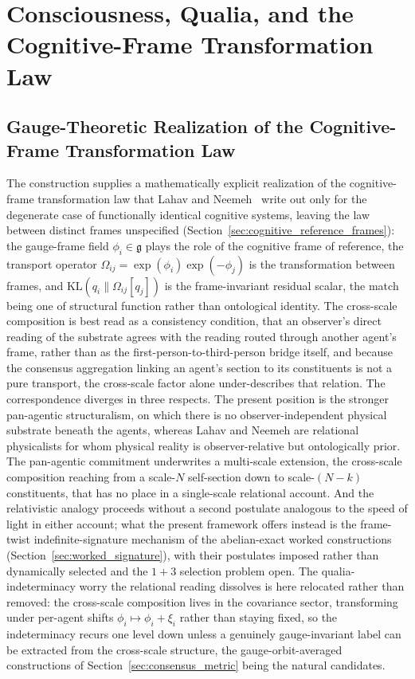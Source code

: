 \documentclass[11pt]{article}
\begin{document}
\section{Consciousness, Qualia, and the Cognitive-Frame Transformation Law}\label{sec:consciousness}

\subsection{Gauge-Theoretic Realization of the Cognitive-Frame Transformation Law}
\label{sec:lahav_convergence}

The construction supplies a mathematically explicit realization of the cognitive-frame transformation law that Lahav and Neemeh~\cite{LahavNeemeh2022, LahavNeemeh2025} write out only for the degenerate case of functionally identical cognitive systems, leaving the law between distinct frames unspecified (Section~\ref{sec:cognitive_reference_frames}): the gauge-frame field $\phi_i \in \mathfrak{g}$ plays the role of the cognitive frame of reference, the transport operator $\Omega_{ij} = \exp(\phi_i)\exp(-\phi_j)$ is the transformation between frames, and $\mathrm{KL}(q_i \| \Omega_{ij}[q_j])$ is the frame-invariant residual scalar, the match being one of structural function rather than ontological identity. The cross-scale composition is best read as a consistency condition, that an observer's direct reading of the substrate agrees with the reading routed through another agent's frame, rather than as the first-person-to-third-person bridge itself, and because the consensus aggregation linking an agent's section to its constituents is not a pure transport, the cross-scale factor alone under-describes that relation. The correspondence diverges in three respects. The present position is the stronger pan-agentic structuralism, on which there is no observer-independent physical substrate beneath the agents, whereas Lahav and Neemeh are relational physicalists for whom physical reality is observer-relative but ontologically prior. The pan-agentic commitment underwrites a multi-scale extension, the cross-scale composition reaching from a scale-$N$ self-section down to scale-$(N-k)$ constituents, that has no place in a single-scale relational account. And the relativistic analogy proceeds without a second postulate analogous to the speed of light in either account; what the present framework offers instead is the frame-twist indefinite-signature mechanism of the abelian-exact worked constructions (Section~\ref{sec:worked_signature}), with their postulates imposed rather than dynamically selected and the $1{+}3$ selection problem open. The qualia-indeterminacy worry the relational reading dissolves is here relocated rather than removed: the cross-scale composition lives in the covariance sector, transforming under per-agent shifts $\phi_i \mapsto \phi_i + \xi_i$ rather than staying fixed, so the indeterminacy recurs one level down unless a genuinely gauge-invariant label can be extracted from the cross-scale structure, the gauge-orbit-averaged constructions of Section~\ref{sec:consensus_metric} being the natural candidates.
\end{document}
